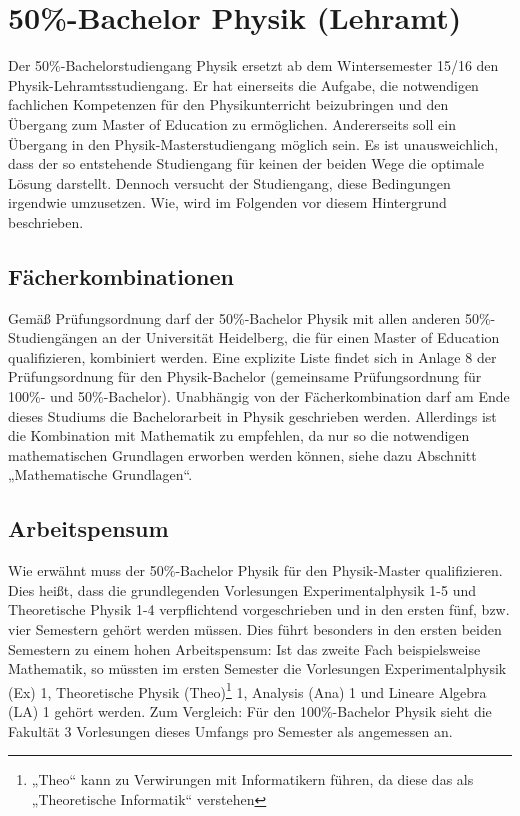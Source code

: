 \section{50\%-Bachelor Physik (Lehramt)} %

Der 50\%-Bachelorstudiengang Physik ersetzt ab dem Wintersemester 15/16 den
Physik-Lehramtsstudiengang. Er hat einerseits die Aufgabe, die notwendigen
fachlichen Kompetenzen für den Physikunterricht beizubringen und den
Übergang zum Master of Education zu ermöglichen. Andererseits soll ein
Übergang in den Physik-Masterstudiengang möglich sein. Es ist
unausweichlich, dass der so entstehende Studiengang für keinen der beiden
Wege die optimale Lösung darstellt. Dennoch versucht der Studiengang, diese
Bedingungen irgendwie umzusetzen. Wie, wird im Folgenden vor diesem Hintergrund
beschrieben.


\subsection{Fächerkombinationen}

Gemäß Prüfungsordnung darf der 50\%-Bachelor Physik mit allen anderen
50\%-Studiengängen an der Universität Heidelberg, die für einen Master of
Education qualifizieren, kombiniert werden. Eine explizite Liste findet sich
in Anlage 8 der Prüfungsordnung für den Physik-Bachelor (gemeinsame
Prüfungsordnung für 100\%- und 50\%-Bachelor). Unabhängig von der
Fächerkombination darf am Ende dieses Studiums die Bachelorarbeit in Physik
geschrieben werden. Allerdings ist die Kombination mit Mathematik zu
empfehlen, da nur so die notwendigen mathematischen Grundlagen erworben
werden können, siehe dazu Abschnitt „Mathematische Grundlagen“.


\subsection{Arbeitspensum}

Wie erwähnt muss der 50\%-Bachelor Physik für den Physik-Master
qualifizieren. Dies heißt, dass die grundlegenden Vorlesungen
Experimentalphysik 1-5 und Theoretische Physik 1-4 verpflichtend
vorgeschrieben und in den ersten fünf, bzw. vier Semestern gehört werden
müssen. Dies führt besonders in den ersten beiden Semestern zu einem hohen
Arbeitspensum: Ist das zweite Fach beispielsweise Mathematik, so müssten im
ersten Semester die Vorlesungen Experimentalphysik (Ex) 1, Theoretische
Physik (Theo)\footnote{„Theo“ kann zu Verwirungen mit Informatikern führen,
da diese das als „Theoretische Informatik“ verstehen} 1,
Analysis (Ana) 1 und Lineare Algebra (LA) 1 gehört werden.
Zum Vergleich: Für den 100\%-Bachelor Physik sieht die Fakultät 3
Vorlesungen dieses Umfangs pro Semester als angemessen an.

